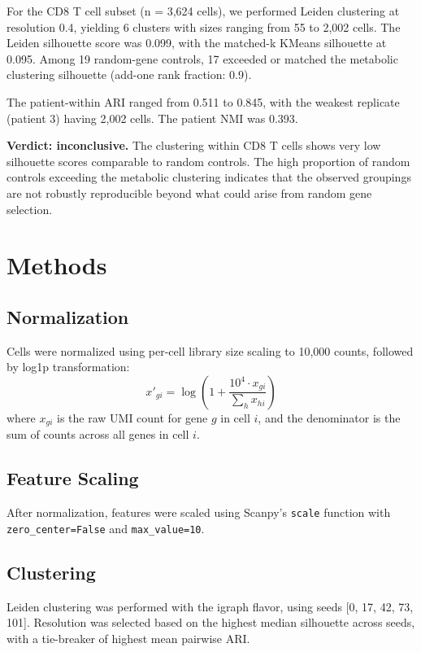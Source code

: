 \documentclass[12pt]{article}
\begin{document}
For the CD8 T cell subset (n = 3,624 cells), we performed Leiden clustering at resolution 0.4, yielding 6 clusters with sizes ranging from 55 to 2,002 cells. The Leiden silhouette score was 0.099, with the matched-k KMeans silhouette at 0.095. Among 19 random-gene controls, 17 exceeded or matched the metabolic clustering silhouette (add-one rank fraction: 0.9).

The patient-within ARI ranged from 0.511 to 0.845, with the weakest replicate (patient 3) having 2,002 cells. The patient NMI was 0.393.

\textbf{Verdict: inconclusive.} The clustering within CD8 T cells shows very low silhouette scores comparable to random controls. The high proportion of random controls exceeding the metabolic clustering indicates that the observed groupings are not robustly reproducible beyond what could arise from random gene selection.

\section*{Methods}

\subsection*{Normalization}

Cells were normalized using per-cell library size scaling to 10,000 counts, followed by log1p transformation:
\begin{equation}
x'_{gi} = \log\left(1 + \frac{10^4 \cdot x_{gi}}{\sum_h x_{hi}}\right)
\end{equation}
where $x_{gi}$ is the raw UMI count for gene $g$ in cell $i$, and the denominator is the sum of counts across all genes in cell $i$.

\subsection*{Feature Scaling}

After normalization, features were scaled using Scanpy's \texttt{scale} function with \texttt{zero\_center=False} and \texttt{max\_value=10}.

\subsection*{Clustering}

Leiden clustering was performed with the igraph flavor, using seeds [0, 17, 42, 73, 101]. Resolution was selected based on the highest median silhouette across seeds, with a tie-breaker of highest mean pairwise ARI.
\end{document}
